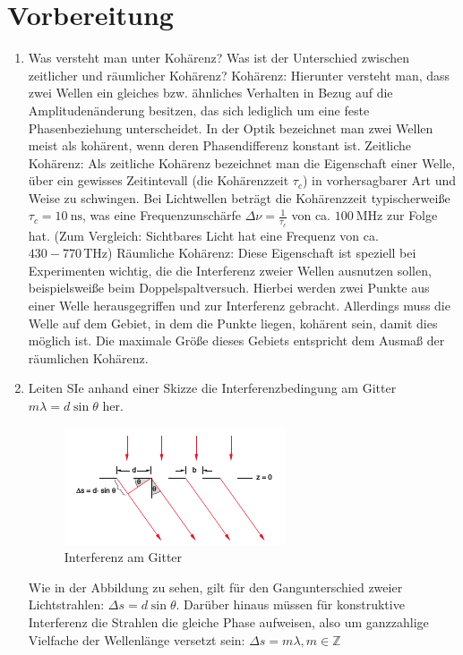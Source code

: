 \section{Vorbereitung}
\begin{enumerate}
	\item Was versteht man unter Kohärenz? Was ist der Unterschied zwischen zeitlicher und räumlicher Kohärenz?
		\subitem Kohärenz: Hierunter versteht man, dass zwei Wellen ein gleiches bzw. ähnliches Verhalten in Bezug auf die Amplitudenänderung besitzen, das sich lediglich um eine feste Phasenbeziehung unterscheidet. In der Optik bezeichnet man zwei Wellen meist als kohärent, wenn deren Phasendifferenz konstant ist.
		\subitem Zeitliche Kohärenz: Als zeitliche Kohärenz bezeichnet man die Eigenschaft einer Welle, über ein gewisses Zeitintevall (die Kohärenzzeit $\tau_c$) in vorhersagbarer Art und Weise zu schwingen. Bei Lichtwellen beträgt die Kohärenzzeit typischerweiße $\tau_c=\SI{10}{\nano\second}$, was eine Frequenzunschärfe $\Delta\nu=\frac{1}{\tau_c}$ von ca. $\SI{100}{\mega\hertz}$ zur Folge hat. (Zum Vergleich: Sichtbares Licht hat eine Frequenz von ca. $430-770\,\si{\tera\hertz}$)
		\subitem Räumliche Kohärenz: Diese Eigenschaft ist speziell bei Experimenten wichtig, die die Interferenz zweier Wellen ausnutzen sollen, beispielsweiße beim Doppelspaltversuch. Hierbei werden zwei Punkte aus einer Welle herausgegriffen und zur Interferenz gebracht. Allerdings muss die Welle auf dem Gebiet, in dem die Punkte liegen, kohärent sein, damit dies möglich ist. Die maximale Größe dieses Gebiets entspricht dem Ausmaß der räumlichen Kohärenz.
	\item Leiten SIe anhand einer Skizze die Interferenzbedingung am Gitter $m\lambda=d\sin\theta$ her. 
		\subitem \begin{figure}[!hb]
			\centering
			\includegraphics[]{interferenz}
			\caption{Interferenz am Gitter}
			\label{fig:Abb1}
		\end{figure}
		Wie in der Abbildung zu sehen, gilt für den Gangunterschied zweier Lichtstrahlen: $\Delta s=d\sin\theta$.
		Darüber hinaus müssen für konstruktive Interferenz die Strahlen die gleiche Phase aufweisen, also um ganzzahlige Vielfache der Wellenlänge versetzt sein: $\Delta s=m\lambda, m\in\mathbb{Z}$
		

\end{enumerate}
